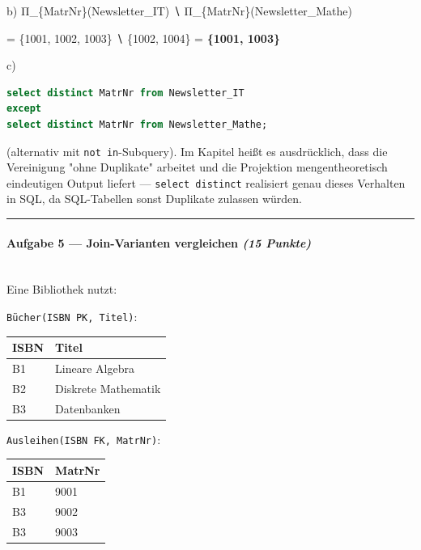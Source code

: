 \documentclass[11pt, a4paper]{article}
\begin{document}
b) Π\_\{MatrNr\}(Newsletter\_IT) ∖ Π\_\{MatrNr\}(Newsletter\_Mathe)


= \{1001, 1002, 1003\} ∖ \{1002, 1004\} = \textbf{\{1001, 1003\}}


c)

\begin{lstlisting}[language=sql]
select distinct MatrNr from Newsletter_IT
except
select distinct MatrNr from Newsletter_Mathe;
\end{lstlisting}

(alternativ mit \texttt{not in}-Subquery). Im Kapitel heißt es ausdrücklich, dass die Vereinigung "ohne Duplikate" arbeitet und die Projektion mengentheoretisch eindeutigen Output liefert — \texttt{select distinct} realisiert genau dieses Verhalten in SQL, da SQL-Tabellen sonst Duplikate zulassen würden.



\noindent\textcolor{rulegray}{\rule{\linewidth}{0.4pt}}


\paragraph{Aufgabe 5 — Join-Varianten vergleichen \textit{(15 Punkte)}}\mbox{}\\[2pt]

Eine Bibliothek nutzt:


\texttt{Bücher(ISBN PK, Titel)}:



{\small
\begin{tabularx}{\linewidth}{XX}
\hline
\rowcolor{tableheadbg}
{\color{white}\textbf{ISBN}} & {\color{white}\textbf{Titel}} \\[2pt]
\hline
\endhead
\hline
\endfoot
B1 & Lineare Algebra \\
B2 & Diskrete Mathematik \\
B3 & Datenbanken \\
\end{tabularx}
}


\texttt{Ausleihen(ISBN FK, MatrNr)}:



{\small
\begin{tabularx}{\linewidth}{XX}
\hline
\rowcolor{tableheadbg}
{\color{white}\textbf{ISBN}} & {\color{white}\textbf{MatrNr}} \\[2pt]
\hline
\endhead
\hline
\endfoot
B1 & 9001 \\
B3 & 9002 \\
B3 & 9003 \\
\end{tabularx}
}
\end{document}
